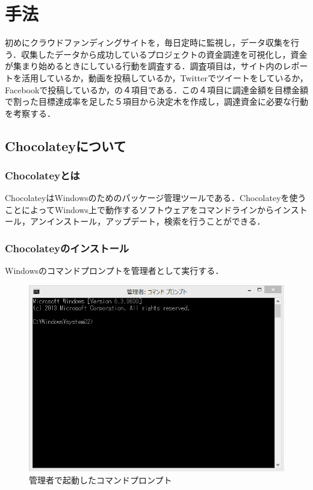 \chapter{手法}
初めにクラウドファンディングサイトを，毎日定時に監視し，データ収集を行う．収集したデータから成功しているプロジェクトの資金調達を可視化し，資金が集まり始めるときにしている行動を調査する．調査項目は，サイト内のレポートを活用しているか，動画を投稿しているか，Twitterでツイートをしているか，Facebookで投稿しているか，の４項目である．この４項目に調達金額を目標金額で割った目標達成率を足した５項目から決定木を作成し，調達資金に必要な行動を考察する．

\newpage

\section{Chocolateyについて}
\subsection{Chocolateyとは}
ChocolateyはWindowsのためのパッケージ管理ツールである．Chocolateyを使うことによってWindows上で動作するソフトウェアをコマンドラインからインストール，アンインストール，アップデート，検索を行うことができる．

\subsection{Chocolateyのインストール}
Windowsのコマンドプロンプトを管理者として実行する．

\begin{figure}[h]
\centering
\includegraphics[width=12cm]{choco1.PNG}
\caption{管理者で起動したコマンドプロンプト}\label{サンプル図}
\end{figure}

